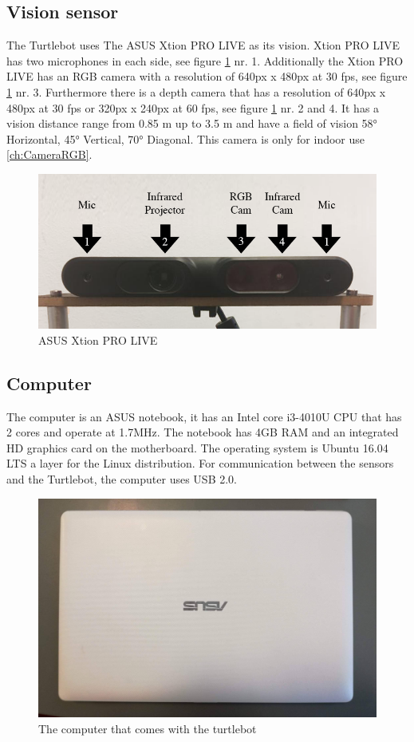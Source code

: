 \subsection{Vision sensor} %
The Turtlebot uses The ASUS Xtion PRO LIVE as its vision. Xtion PRO LIVE has two microphones in each side, see figure \ref{fig:asusCamera} nr. 1. Additionally the Xtion PRO LIVE has an RGB camera with a resolution of 640px x 480px at 30 fps, see figure \ref{fig:asusCamera} nr. 3. Furthermore there is a depth camera that has a resolution of 640px x 480px at 30 fps or 320px x 240px at 60 fps, see figure \ref{fig:asusCamera} nr. 2 and 4.
It has a vision distance range from 0.85 m up to 3.5 m and have a field of vision 58° Horizontal, 45° Vertical, 70° Diagonal.
This camera is only for indoor use \ref{ch:CameraRGB}.
\begin{figure}[h]
    \centering
    \includegraphics[width=\textwidth]{figures/camera02.png}
    \caption{ASUS Xtion PRO LIVE} 
    \label{fig:asusCamera} 
\end{figure}

\subsection{Computer} 
The computer is an ASUS notebook, it has an Intel core i3-4010U CPU that has 2 cores and operate at 1.7MHz\cite{CPU}. The notebook has 4GB RAM and an integrated HD graphics card on the motherboard\cite{ASUS}.
The operating system is Ubuntu 16.04 LTS a layer for the Linux distribution. For communication between the sensors and the Turtlebot, the computer uses USB 2.0.
\begin{figure}[h]
   \centering
    \includegraphics[width=.4\textwidth]{figures/ASUS.jpg}
    \caption{The computer that comes with the turtlebot}
    \label{fig:ASUS}
\end{figure}